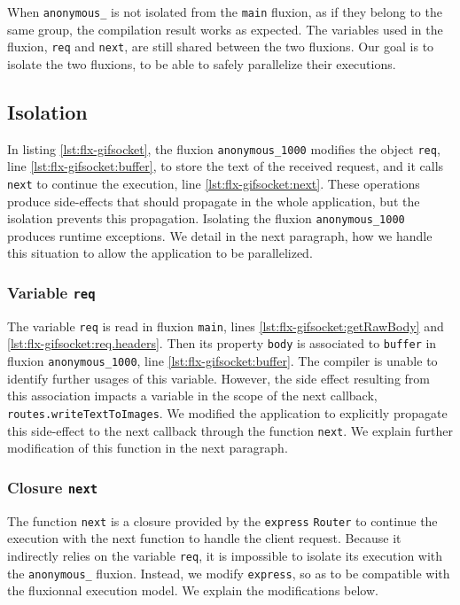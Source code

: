 When \texttt{anonymous\_} is not isolated from the \texttt{main} fluxion, as if they belong to the same group, the compilation result works as expected.
The variables used in the fluxion, \texttt{req} and \texttt{next}, are still shared between the two fluxions.
Our goal is to isolate the two fluxions, to be able to safely parallelize their executions.

\eject

\subsection{Isolation}

In listing \ref{lst:flx-gifsocket}, the fluxion \texttt{anonymous\_1000} modifies the object \texttt{req}, line \ref{lst:flx-gifsocket:buffer}, to store the text of the received request, and it calls \texttt{next} to continue the execution, line \ref{lst:flx-gifsocket:next}.
These operations produce side-effects that should propagate in the whole application, but the isolation prevents this propagation.
Isolating the fluxion \texttt{anonymous\_1000} produces runtime exceptions.
We detail in the next paragraph, how we handle this situation to allow the application to be parallelized.

\subsubsection{Variable \texttt{req}}

The variable \texttt{req} is read in fluxion \texttt{main}, lines \ref{lst:flx-gifsocket:getRawBody} and \ref{lst:flx-gifsocket:req.headers}.
Then its property \texttt{body} is associated to \texttt{buffer} in fluxion \texttt{anonymous\_1000}, line \ref{lst:flx-gifsocket:buffer}.
The compiler is unable to identify further usages of this variable.
However, the side effect resulting from this association impacts a variable in the scope of the next callback, \texttt{routes.writeTextToImages}.
We modified the application to explicitly propagate this side-effect to the next callback through the function \texttt{next}.
We explain further modification of this function in the next paragraph.

\subsubsection{Closure \texttt{next}}

The function \texttt{next} is a closure provided by the \texttt{express} \texttt{Router} to continue the execution with the next function to handle the client request.
Because it indirectly relies on the variable \texttt{req}, it is impossible to isolate its execution with the \texttt{anonymous\_} fluxion.
Instead, we modify \texttt{express}, so as to be compatible with the fluxionnal execution model.
We explain the modifications below.

